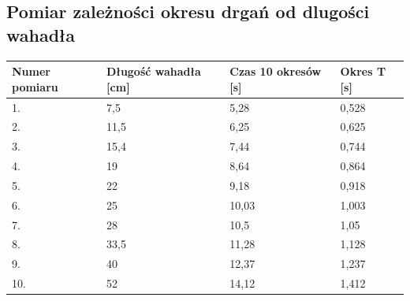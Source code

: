 \documentclass[a4paper,11pt]{article}
\begin{document}
\subsection{Pomiar zależności okresu drgań od dlugości wahadła}

\begin{table}[h]
\centering
\begin{tabular}{|l|l|l|l|}
\hline
Numer pomiaru & Długość wahadła {[}cm{]} &Czas 10 okresów {[}s{]} & Okres T {[}s{]} \\ \hline
1.            &7,5 & 5,28                    & 0,528                \\ \hline
2.            &11,5 & 6,25                    & 0,625                 \\ \hline
3.            &15,4 & 7,44                    & 0,744                 \\ \hline
4.            &19 & 8,64                    & 0,864                 \\ \hline
5.            &22 & 9,18                    & 0,918                 \\ \hline
6.            &25 & 10,03                    & 1,003                 \\ \hline
7.            &28 & 10,5                    & 1,05                 \\ \hline
8.            &33,5 & 11,28                    & 1,128                 \\ \hline
9.            &40 & 12,37                    & 1,237                 \\ \hline
10.           &52 & 14,12                    & 1,412                 \\ \hline
\end{tabular}
\end{table}
\end{document}

